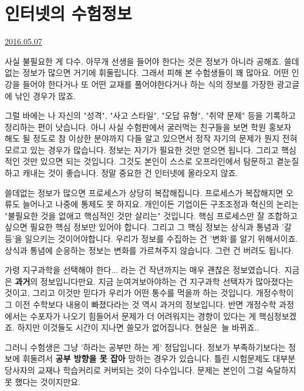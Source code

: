 \section{인터넷의 수험정보}
\href{https://www.kockoc.com/Apoc/764299}{2016.05.07}

\vspace{5mm}

사실 불필요한 게 다수.
아무개 선생을 들어야 한다는 것은 정보가 아니라 공해죠.
쓸데없는 정보가 많으면 거기에 휘둘립니다. 그래서 피해 본 수험생들이 꽤 많아요.
어떤 인강을 들어야 한다거나 또 어떤 교재를 풀어야한다거나 하는 식의 정보를 가장한 광고글에 낚인 경우가 많죠.
\vspace{5mm}

그럴 바에는 나 자신의 "성격", "사고 스타일", "오답 유형", "취약 문제" 등을 기록하고 정리하는 편이 낫습니다.
아니 사실 수험판에서 굴러먹는 친구들을 보면 학원 홍보자 해도 될 정도로 참 이상한 분야까지 다들 알고 있으면서
정작 자기의 문제가 뭔지 전혀 모르고 있는 경우가 많습니다.
정보는 자기가 필요한 것만 얻으면 됩니다. 그리고 핵심적인 것만 있으면 되는 것입니다.
그것도 본인이 스스로 오프라인에서 탐문하고 곁눈질하고 캐내는 것이 좋습니다. 정말 중요한 건 인터넷에 올라오지 않죠.
\vspace{5mm}

쓸데없는 정보가 많으면 프로세스가 상당히 복잡해집니다. 프로세스가 복잡해지면 오류도 늘어나고 나중에 통제도 못 하지요.
개인이든 기업이든 구조조정과 혁신의 논리는 "불필요한 것을 없애고 핵심적인 것만 살리는" 것입니다.
핵심 프로세스만 잘 조합하고 싶으면 필요한 핵심 정보만 있어야 합니다.
그리고 그 핵심 정보는 상식과 통념과 '갈등'을 일으키는 것이어야합니다. 우리가 정보를 수집하는 건 '변화'를 알기 위해서이죠.
상식과 통념에 순응하는 정보는 변화를 가르쳐주지 않습니다. 그런 건 버려도 됩니다.
\vspace{5mm}

가령 지구과학을 선택해야 한다... 라는 건 작년까지는 매우 괜찮은 정보였습니다. 지금은 \textbf{과거}의 정보입니다만요.
지금 눈여겨보아야하는 건 지구과학 선택자가 많아졌다는 것이고, 그리고 이것만 믿다가 우리가 어떤 통수를 먹을까 하는 것입니다.
개정수학이 그 이전 수학보다 내용이 빠졌다라는 것 역시 과거의 정보입니다.
반면 개정수학 과정에서는 수포자가 나오기 힘들어서 문제가 더 어려워지는 경향이 있다는 게 핵심정보겠죠.
하지만 이것들도 시간이 지나면 쓸모가 없어집니다. 현실은 늘 바뀌죠..
\vspace{5mm}

그러니 수험생은 그냥 '하라는 공부만 하는 게' 정답입니다.
정보가 부족하기보다는 정보에 휘둘려서 \textbf{공부 방향을 못 잡아} 망하는 경우가 있습니다.
틀린 시험문제도 대부분 당사자의 교재나 학습커리로 커버되는 것이 다수입니다. 문제는 본인이 그걸 숙달하지 못 했다는 것이지만요.
\vspace{5mm}









